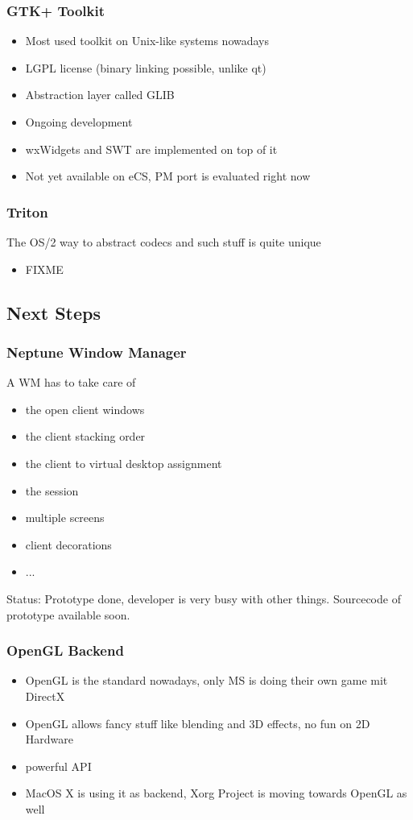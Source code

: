 \documentclass{beamer}
\begin{document}
\begin{frame}
\frametitle{GTK+ Toolkit}
\begin{itemize}[<+->]
  \item Most used toolkit on Unix-like systems nowadays
  \item LGPL license (binary linking possible, unlike qt)
  \item Abstraction layer called GLIB
  \item Ongoing development
  \item wxWidgets and SWT are implemented on top of it
  \item Not yet available on eCS, PM port is evaluated right now
\end{itemize}
\end{frame}

\begin{frame}
\frametitle{Triton}
The OS/2 way to abstract codecs and such stuff is quite unique
\begin{itemize}[<+->]
	\item FIXME
\end{itemize}
\end{frame}

\subsection{Next Steps}

\begin{frame}
\frametitle{Neptune Window Manager}
A WM has to take care of
\begin{itemize}[<+->]
  \item the open client windows
  \item the client stacking order
  \item the client to virtual desktop assignment
  \item the session
  \item multiple screens
  \item client decorations
  \item ...
\end{itemize}
Status: Prototype done, developer is very busy with other things. Sourcecode
of prototype available soon.
\end{frame}

\begin{frame}
\frametitle{OpenGL Backend}
\begin{itemize}[<+->]
  \item OpenGL is the standard nowadays, only MS is doing their own game mit DirectX
  \item OpenGL allows fancy stuff like blending and 3D effects, no fun on 2D Hardware
  \item powerful API
  \item MacOS X is using it as backend, Xorg Project is moving towards OpenGL as well
\end{itemize}
\end{frame}
\end{document}
